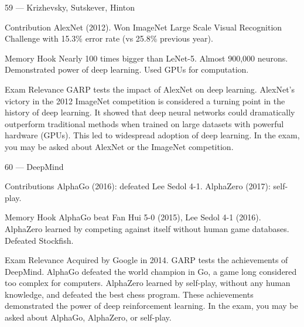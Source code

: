 \documentclass[aspectratio=169,8pt]{beamer}
\begin{document}
	\begin{frame}{59 --- Krizhevsky, Sutskever, Hinton}
		\begin{block}{Contribution}
			AlexNet (2012). Won ImageNet Large Scale Visual Recognition Challenge with 15.3\% error rate (vs 25.8\% previous year).
		\end{block}
		\begin{block}{Memory Hook}
			Nearly 100 times bigger than LeNet-5. Almost 900,000 neurons. Demonstrated power of deep learning. Used GPUs for computation.
		\end{block}
		\begin{block}{Exam Relevance}
			GARP tests the impact of AlexNet on deep learning. AlexNet's victory in the 2012 ImageNet competition is considered a turning point in the history of deep learning. It showed that deep neural networks could dramatically outperform traditional methods when trained on large datasets with powerful hardware (GPUs). This led to widespread adoption of deep learning. In the exam, you may be asked about AlexNet or the ImageNet competition.
		\end{block}
	\end{frame}
	
	\begin{frame}{60 --- DeepMind}
		\begin{block}{Contributions}
			AlphaGo (2016): defeated Lee Sedol 4-1. AlphaZero (2017): self-play.
		\end{block}
		\begin{block}{Memory Hook}
			AlphaGo beat Fan Hui 5-0 (2015), Lee Sedol 4-1 (2016). AlphaZero learned by competing against itself without human game databases. Defeated Stockfish.
		\end{block}
		\begin{block}{Exam Relevance}
			Acquired by Google in 2014. GARP tests the achievements of DeepMind. AlphaGo defeated the world champion in Go, a game long considered too complex for computers. AlphaZero learned by self-play, without any human knowledge, and defeated the best chess program. These achievements demonstrated the power of deep reinforcement learning. In the exam, you may be asked about AlphaGo, AlphaZero, or self-play.
		\end{block}
	\end{frame}
	
\end{document}
